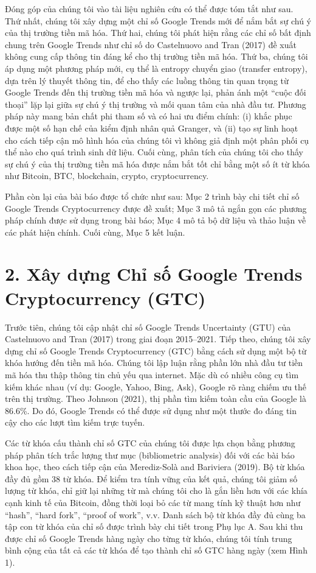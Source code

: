 Đóng góp của chúng tôi vào tài liệu nghiên cứu có thể được tóm tắt như sau. Thứ nhất, chúng tôi xây dựng một chỉ số Google Trends mới để nắm bắt sự chú ý của thị trường tiền mã hóa. Thứ hai, chúng tôi phát hiện rằng các chỉ số bất định chung trên Google Trends như chỉ số do Castelnuovo and Tran (2017) đề xuất không cung cấp thông tin đáng kể cho thị trường tiền mã hóa. Thứ ba, chúng tôi áp dụng một phương pháp mới, cụ thể là entropy chuyển giao (transfer entropy), dựa trên lý thuyết thông tin, để cho thấy các luồng thông tin quan trọng từ Google Trends đến thị trường tiền mã hóa và ngược lại, phản ánh một ``cuộc đối thoại'' lặp lại giữa sự chú ý thị trường và mối quan tâm của nhà đầu tư. Phương pháp này mang bản chất phi tham số và có hai ưu điểm chính: (i) khắc phục được một số hạn chế của kiểm định nhân quả Granger, và (ii) tạo sự linh hoạt cho cách tiếp cận mô hình hóa của chúng tôi vì không giả định một phân phối cụ thể nào cho quá trình sinh dữ liệu. Cuối cùng, phân tích của chúng tôi cho thấy sự chú ý của thị trường tiền mã hóa được nắm bắt tốt chỉ bằng một số ít từ khóa như Bitcoin, BTC, blockchain, crypto, cryptocurrency.

Phần còn lại của bài báo được tổ chức như sau: Mục 2 trình bày chi tiết chỉ số Google Trends Cryptocurrency được đề xuất; Mục 3 mô tả ngắn gọn các phương pháp chính được sử dụng trong bài báo; Mục 4 mô tả bộ dữ liệu và thảo luận về các phát hiện chính. Cuối cùng, Mục 5 kết luận.

\section{2. Xây dựng Chỉ số Google Trends Cryptocurrency (GTC)}

Trước tiên, chúng tôi cập nhật chỉ số Google Trends Uncertainty (GTU) của Castelnuovo and Tran (2017) trong giai đoạn 2015--2021. Tiếp theo, chúng tôi xây dựng chỉ số Google Trends Cryptocurrency (GTC) bằng cách sử dụng một bộ từ khóa hướng đến tiền mã hóa. Chúng tôi lập luận rằng phần lớn nhà đầu tư tiền mã hóa thu thập thông tin chủ yếu qua internet. Mặc dù có nhiều công cụ tìm kiếm khác nhau (ví dụ: Google, Yahoo, Bing, Ask), Google rõ ràng chiếm ưu thế trên thị trường. Theo Johnson (2021), thị phần tìm kiếm toàn cầu của Google là 86.6\%. Do đó, Google Trends có thể được sử dụng như một thước đo đáng tin cậy cho các lượt tìm kiếm trực tuyến.

Các từ khóa cấu thành chỉ số GTC của chúng tôi được lựa chọn bằng phương pháp phân tích trắc lượng thư mục (bibliometric analysis) đối với các bài báo khoa học, theo cách tiếp cận của Merediz-Solà and Bariviera (2019). Bộ từ khóa đầy đủ gồm 38 từ khóa. Để kiểm tra tính vững của kết quả, chúng tôi giảm số lượng từ khóa, chỉ giữ lại những từ mà chúng tôi cho là gắn liền hơn với các khía cạnh kinh tế của Bitcoin, đồng thời loại bỏ các từ mang tính kỹ thuật hơn như ``hash'', ``hard fork'', ``proof of work'', v.v. Danh sách bộ từ khóa đầy đủ cùng ba tập con từ khóa của chỉ số được trình bày chi tiết trong Phụ lục A. Sau khi thu được chỉ số Google Trends hàng ngày cho từng từ khóa, chúng tôi tính trung bình cộng của tất cả các từ khóa để tạo thành chỉ số GTC hàng ngày (xem Hình 1).

